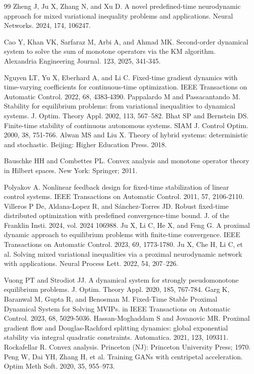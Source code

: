 \documentclass{article}
\theoremstyle{plain}%
\theoremstyle{thmstyletwo}%
\theoremstyle{thmstylethree}%
\begin{document}
\begin{thebibliography}{99}
Zheng J, Ju X, Zhang N, and Xu D. A novel predefined-time neurodynamic approach for mixed variational inequality problems and applications. Neural Networks. 2024, 174, 106247. 

 Cao Y, Khan VK, Sarfaraz M, Arbi A, and Ahmad MK. Second-order dynamical system to solve the sum of monotone operators via the KM algorithm. Alexandria Engineering Journal. 123, 2025, 341-345.

 Nguyen LT, Yu X, Eberhard A, and Li C. Fixed-time gradient dynamics with time-varying coefficients for continuous-time optimization. IEEE Transactions on Automatic Control. 2022, 68, 4383-4390.
 Pappalardo M and Passacantando M. Stability for equilibrium problems: from variational inequalities to dynamical systems. J. Optim. Theory Appl. 2002, 113, 567–582.
 Bhat SP and Bernstein DS. Finite-time stability of continuous autonomous systems. SIAM J. Control Optim. 2000, 38, 751-766. 
 Alwan MS and Liu X. Theory of hybrid systems: deterministic and stochastic. Beijing: Higher Education Press. 2018.

 Bauschke HH and Combettes PL. Convex analysis and monotone operator theory in Hilbert spaces. New York: Springer; 2011.

 Polyakov A. Nonlinear feedback design for fixed-time stabilization of linear control systems. IEEE Transactions on Automatic Control. 2011, 57, 2106-2110.
 Villeros P De, Aldana-Lopez R, and Sánchez-Torres JD. Robust fixed-time distributed optimization with predefined convergence-time bound. J. of the Franklin Insti. 2024, vol. 2024 106988.
 Ju X, Li C, He X, and Feng G. A proximal dynamic approach to equilibrium problems with finite-time convergence. IEEE Transactions on Automatic Control. 2023, 69, 1773-1780.
 Ju X, Che H, Li C, et al. Solving mixed variational inequalities via a proximal neurodynamic network with applications. Neural Process Lett. 2022, 54, 207–226.

 Vuong PT and Strodiot JJ. A dynamical system for strongly pseudomonotone equilibrium problems. J. Optim. Theory Appl. 2020, 185, 767-784.
 Garg K, Baranwal M, Gupta R, and Benosman M. Fixed-Time Stable Proximal Dynamical System for Solving MVIPs. in IEEE Transactions on Automatic Control. 2023, 68, 5029-5036. 
 Hassan-Moghaddam S and Jovanovic MR. Proximal gradient flow and Douglas-Rachford splitting dynamics: global exponential stability via integral quadratic constraints. Automatica. 2021, 123, 109311.
 Rockafellar R. Convex analysis. Princeton (NJ): Princeton University Press; 1970.
  Peng W, Dai YH, Zhang H, et al. Training GANs with centripetal acceleration. Optim Meth Soft. 2020, 35, 955–973.


\end{thebibliography}
\end{document}

